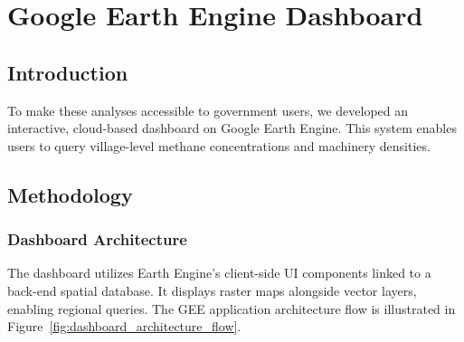 \documentclass[12pt,a4paper]{report}
\begin{document}
\chapter{Google Earth Engine Dashboard}
\label{ch:dashboard}

\section{Introduction}
To make these analyses accessible to government users, we developed an interactive, cloud-based dashboard on Google Earth Engine. This system enables users to query village-level methane concentrations and machinery densities.

\section{Methodology}
\subsection{Dashboard Architecture}
The dashboard utilizes Earth Engine's client-side UI components linked to a back-end spatial database. It displays raster maps alongside vector layers, enabling regional queries. The GEE application architecture flow is illustrated in Figure~\ref{fig:dashboard_architecture_flow}.
\end{document}
